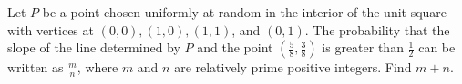 Let $P$ be a point chosen uniformly at random in the interior of the unit square with vertices at $(0,0), (1,0), (1,1)$, and $(0,1)$. The probability that the slope of the line determined by $P$ and the point $\left(\frac58, \frac38 \right)$ is greater than $\frac12$ can be written as $\frac{m}{n}$, where $m$ and $n$ are relatively prime positive integers. Find $m+n$.